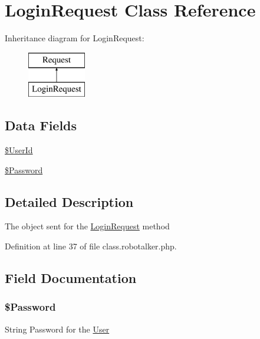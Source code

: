 \hypertarget{class_login_request}{\section{Login\-Request Class Reference}
\label{class_login_request}
}
Inheritance diagram for Login\-Request\-:\begin{figure}[H]
\begin{center}
\leavevmode
\includegraphics[height=2.000000cm]{class_login_request}
\end{center}
\end{figure}
\subsection*{Data Fields}
\begin{DoxyCompactItemize}
\item 
\hyperlink{class_login_request_a5e6181896c4104715348824d02a3075d}{\$\-User\-Id}
\item 
\hyperlink{class_login_request_ae3ac8512c0fd8924c7112671ead08cf7}{\$\-Password}
\end{DoxyCompactItemize}


\subsection{Detailed Description}
The object sent for the \hyperlink{class_login_request}{Login\-Request} method 

Definition at line 37 of file class.\-robotalker.\-php.



\subsection{Field Documentation}
\hypertarget{class_login_request_ae3ac8512c0fd8924c7112671ead08cf7}{
\subsubsection[{\$\-Password}]{\setlength{\rightskip}{0pt plus 5cm}\$Password}}\label{class_login_request_ae3ac8512c0fd8924c7112671ead08cf7}
String Password for the \hyperlink{class_user}{User} 

